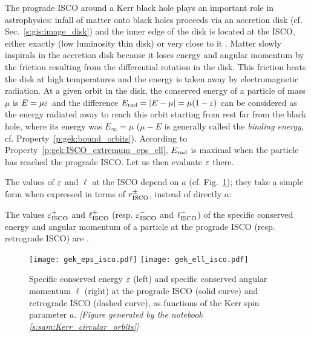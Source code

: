 The prograde ISCO around a Kerr black hole plays an important role in astrophysics:
infall of matter onto black holes proceeds via an accretion disk (cf. Sec.~\ref{s:gis:image_disk}) and
the inner edge of the disk is located at the ISCO, either exactly (low luminosity thin disk)
or very close to it \cite{AbramF13,King23,RezzoZ13}.
Matter slowly inspirals in the accretion disk because it loses energy and angular momentum
by the friction resulting from the differential rotation in the disk. This friction heats the disk at high temperatures and the energy is taken away by electromagnetic radiation. At a given orbit in the disk,
the conserved energy of a particle of mass $\mu$ is $E = \mu \varepsilon$ and the
difference $E_{\rm rad}=|E - \mu|=\mu(1 - \varepsilon)$ can be considered as the energy radiated away to reach this
orbit starting from rest far from the
black hole, where its energy was $E_\infty=\mu$ ($\mu - E$ is generally called the
\emph{binding energy}, cf. Property~\ref{p:gek:bound_orbits}).
According to Property~\ref{p:gek:ISCO_extremum_eps_ell}, $E_{\rm rad}$
is maximal when the particle has reached the prograde ISCO. Let us then evaluate $\varepsilon$
there.

The values of $\varepsilon$ and $\ell$ at the ISCO depend on $a$ (cf. Fig.~\ref{f:gek:eps_ell_isco});
they take a simple form when expressed in terms of $r_{\rm ISCO}^\pm$, instead of directly $a$:

\begin{prop}
The values $\varepsilon_{\rm ISCO}^+$ and $\ell_{\rm ISCO}^+$
(resp. $\varepsilon_{\rm ISCO}^-$ and $\ell_{\rm ISCO}^-$) of the
specific conserved energy and angular momentum of a particle at the prograde ISCO
(resp. retrograde ISCO) are
\be \label{e:gek:veps_ell_ISCO}
    \qand
     .
\ee
\end{prop}

\begin{figure}
\begin{center}
\texttt{[image: gek\_eps\_isco.pdf]}
\texttt{[image: gek\_ell\_isco.pdf]}
\end{center}
\caption[]{\label{f:gek:eps_ell_isco} \footnotesize
Specific conserved energy $\varepsilon$ (left) and specific conserved angular momentum $\ell$ (right)
at the prograde ISCO (solid curve) and retrograde ISCO (dashed curve),
as functions of the Kerr spin parameter $a$.
\textsl{[Figure generated by the notebook \ref{s:sam:Kerr_circular_orbits}]}
}
\end{figure}

